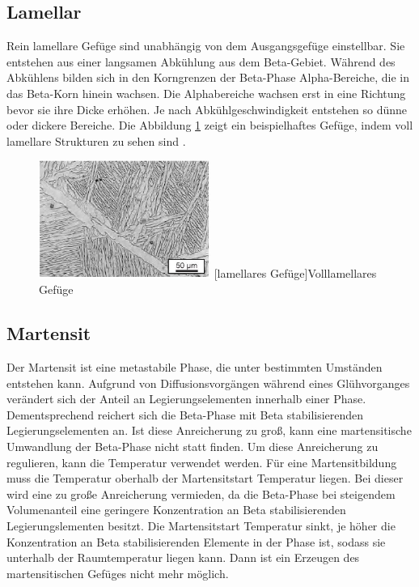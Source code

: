 \documentclass[a4paper, 11pt]{tubsreprt}
\begin{document}
\subsection{Lamellar} \label{section Gefüge Lamellar}
Rein lamellare Gefüge sind unabhängig von dem Ausgangsgefüge einstellbar. Sie entstehen aus einer langsamen Abkühlung aus dem Beta-Gebiet. Während des Abkühlens bilden sich in den Korngrenzen der Beta-Phase Alpha-Bereiche, die in das Beta-Korn hinein wachsen. Die Alphabereiche wachsen erst in eine Richtung bevor sie ihre Dicke erhöhen. Je nach Abkühlgeschwindigkeit entstehen so dünne oder dickere Bereiche. Die Abbildung \ref{lamellar} zeigt ein beispielhaftes Gefüge, indem voll lamellare Strukturen zu sehen sind \cite{Luetjering2007}.


\begin{figure}
	\centering
		\includegraphics[width=0.5\textwidth]{Bilder/lamellar.jpg}
		[lamellares Gefüge]{Volllamellares Gefüge \cite{Leyens2002}}
		\label{lamellar}
		
\end{figure}

\subsection{Martensit}
Der Martensit ist eine metastabile Phase, die unter bestimmten Umständen entstehen kann. Aufgrund von Diffusionsvorgängen während eines Glühvorganges verändert sich der Anteil an Legierungselementen innerhalb einer Phase. Dementsprechend reichert sich die Beta-Phase mit Beta stabilisierenden Legierungselementen an. Ist diese Anreicherung zu groß, kann eine martensitische Umwandlung der Beta-Phase nicht statt finden. Um diese Anreicherung zu regulieren, kann die Temperatur verwendet werden. Für eine Martensitbildung muss die Temperatur oberhalb der Martensitstart Temperatur liegen. Bei dieser wird eine zu große Anreicherung vermieden, da die Beta-Phase bei steigendem Volumenanteil eine geringere Konzentration an Beta stabilisierenden Legierungslementen besitzt. Die Martensitstart Temperatur sinkt, je höher die Konzentration an Beta stabilisierenden Elemente in der Phase ist, sodass sie unterhalb der Raumtemperatur liegen kann. Dann ist ein Erzeugen des martensitischen Gefüges nicht mehr möglich.
\end{document}
